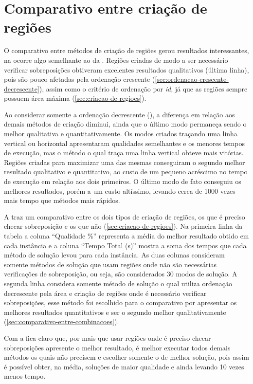 \section{Comparativo entre criação de regiões}\label{sec:comparativo-entre-criacao-de-regioes}

O comparativo entre métodos de criação de regiões gerou resultados interessantes,
na  ocorre algo semelhante ao da .
Regiões criadas de modo a ser necessário verificar sobreposições obtiveram excelentes resultados
qualitativos (última linha), pois são pouco afetadas pela ordenação crescente
(\cref{sec:ordenacao-crescente-decrescente}), assim como o critério de ordenação por \textit{id},
já que as regiões sempre possuem área máxima (\cref{sec:criacao-de-regioes}).



Ao considerar somente a ordenação decrescente (), a diferença em relação
aos demais métodos de criação diminui, ainda que o último modo permaneça sendo o melhor qualitativa
e quantitativamente.
Os modos criados traçando uma linha vertical ou horizontal apresentaram qualidades semelhantes e
os menores tempos de execução, mas o método o qual traça uma linha vertical obteve mais vitórias.
Regiões criadas para maximizar uma das mesmas conseguiram o segundo melhor resultado qualitativo e
quantitativo, ao custo de um pequeno acréscimo no tempo de execução em relação aos dois primeiros.
O último modo de fato conseguiu os melhores resultados, porém a um custo altíssimo, levando cerca
de 1000 vezes mais tempo que métodos mais rápidos.



A  traz um comparativo entre os dois tipos de criação de regiões,
os que é preciso checar sobreposição e os que não (\cref{sec:criacao-de-regioes}).
Na primeira linha da tabela a coluna “Qualidade \%” representa a média do melhor resultado obtido
em cada instância e a coluna “Tempo Total (s)” mostra a soma dos tempos que cada método de solução
levou para cada instância.
As duas colunas consideram somente métodos de solução que usam regiões onde não são necessárias
verificações de sobreposição, ou seja, são considerados 30 modos de solução.
A segunda linha considera somente método de solução o qual utiliza ordenação decrescente pela área
e criação de regiões onde é necessário verificar sobreposições, esse método foi escolhido para o
comparativo por apresentar os melhores resultados quantitativos e ser o segundo melhor
qualitativamente (\cref{sec:comparativo-entre-combinacoes}).



Com a  fica claro que, por mais que usar regiões onde é preciso checar
sobreposições apresente o melhor resultado, é melhor executar todos demais métodos os quais não
precisem e escolher somente o de melhor solução, pois assim é possível obter, na média, soluções
de maior qualidade e ainda levando 10 vezes menos tempo.